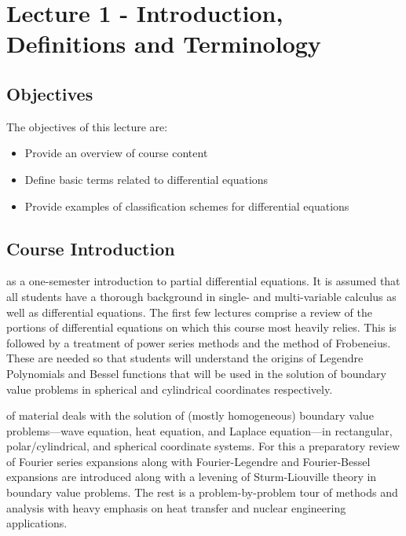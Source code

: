 \chapter{Lecture 1 - Introduction, Definitions and Terminology}
\label{ch:lec1}%
\section{Objectives}
The objectives of this lecture are:
\begin{itemize}
\item Provide an overview of course content
\item Define basic terms related to differential equations
\item Provide examples of classification schemes for differential equations
\end{itemize}

\section{Course Introduction}
 as a one-semester introduction to partial differential equations.  It is assumed that all students have a thorough background in single- and multi-variable calculus as well as differential equations.  The first few lectures comprise a review of the portions of differential equations on which this course most heavily relies.  This is followed by a treatment of power series methods and the method of Frobeneius.  These are needed so that students will understand the origins of Legendre Polynomials and Bessel functions that will be used in the solution of boundary value problems in spherical and cylindrical coordinates respectively.

 of material deals with the solution of (mostly homogeneous) boundary value problems---wave equation, heat equation, and Laplace equation---in rectangular, polar/cylindrical, and spherical coordinate systems.  For this a preparatory review of Fourier series expansions along with Fourier-Legendre and Fourier-Bessel expansions are introduced along with a levening of Sturm-Liouville theory in boundary value problems.  The rest is a problem-by-problem tour of methods and analysis with heavy emphasis on heat transfer and nuclear engineering applications.

